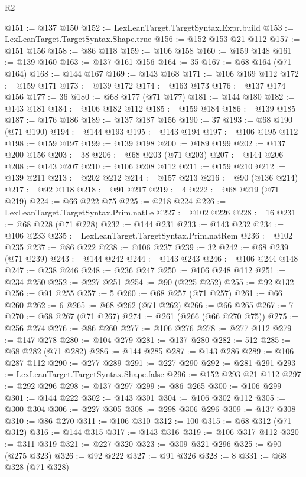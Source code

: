 \begin{lexlean}{R2}
\begin{coremodule}
@151 := @137 @150
@152 := LexLeanTarget.TargetSyntax.Expr.build
@153 := LexLeanTarget.TargetSyntax.Shape.true
@156 := @152 @153 @21 @112
@157 := @151 @156
@158 := @86 @118
@159 := @106 @158
@160 := @159 @148
@161 := @139 @160
@163 := @137 @161 @156
@164 := 35
@167 := @68 @164 (@71 @164)
@168 := @144 @167
@169 := @143 @168
@171 := @106 @169 @112
@172 := @159 @171
@173 := @139 @172
@174 := @163 @173
@176 := @137 @174 @156
@177 := 36
@180 := @68 @177 (@71 @177)
@181 := @144 @180
@182 := @143 @181
@184 := @106 @182 @112
@185 := @159 @184
@186 := @139 @185
@187 := @176 @186
@189 := @137 @187 @156
@190 := 37
@193 := @68 @190 (@71 @190)
@194 := @144 @193
@195 := @143 @194
@197 := @106 @195 @112
@198 := @159 @197
@199 := @139 @198
@200 := @189 @199
@202 := @137 @200 @156
@203 := 38
@206 := @68 @203 (@71 @203)
@207 := @144 @206
@208 := @143 @207
@210 := @106 @208 @112
@211 := @159 @210
@212 := @139 @211
@213 := @202 @212
@214 := @157 @213
@216 := @90 (@136 @214)
@217 := @92 @118
@218 := @91 @217
@219 := 4
@222 := @68 @219 (@71 @219)
@224 := @66 @222 @75
@225 := @218 @224
@226 := LexLeanTarget.TargetSyntax.Prim.natLe
@227 := @102 @226
@228 := 16
@231 := @68 @228 (@71 @228)
@232 := @144 @231
@233 := @143 @232
@234 := @106 @233
@235 := LexLeanTarget.TargetSyntax.Prim.natRem
@236 := @102 @235
@237 := @86 @222
@238 := @106 @237
@239 := 32
@242 := @68 @239 (@71 @239)
@243 := @144 @242
@244 := @143 @243
@246 := @106 @244 @148
@247 := @238 @246
@248 := @236 @247
@250 := @106 @248 @112
@251 := @234 @250
@252 := @227 @251
@254 := @90 (@225 @252)
@255 := @92 @132
@256 := @91 @255
@257 := 5
@260 := @68 @257 (@71 @257)
@261 := @66 @260
@262 := 6
@265 := @68 @262 (@71 @262)
@266 := @66 @265
@267 := 7
@270 := @68 @267 (@71 @267)
@274 := @261 (@266 (@66 @270 @75))
@275 := @256 @274
@276 := @86 @260
@277 := @106 @276
@278 := @277 @112
@279 := @147 @278
@280 := @104 @279
@281 := @137 @280
@282 := 512
@285 := @68 @282 (@71 @282)
@286 := @144 @285
@287 := @143 @286
@289 := @106 @287 @112
@290 := @277 @289
@291 := @227 @290
@292 := @281 @291
@293 := LexLeanTarget.TargetSyntax.Shape.false
@296 := @152 @293 @21 @112
@297 := @292 @296
@298 := @137 @297
@299 := @86 @265
@300 := @106 @299
@301 := @144 @222
@302 := @143 @301
@304 := @106 @302 @112
@305 := @300 @304
@306 := @227 @305
@308 := @298 @306 @296
@309 := @137 @308
@310 := @86 @270
@311 := @106 @310
@312 := 100
@315 := @68 @312 (@71 @312)
@316 := @144 @315
@317 := @143 @316
@319 := @106 @317 @112
@320 := @311 @319
@321 := @227 @320
@323 := @309 @321 @296
@325 := @90 (@275 @323)
@326 := @92 @222
@327 := @91 @326
@328 := 8
@331 := @68 @328 (@71 @328)

\end{coremodule}
\end{lexlean}
